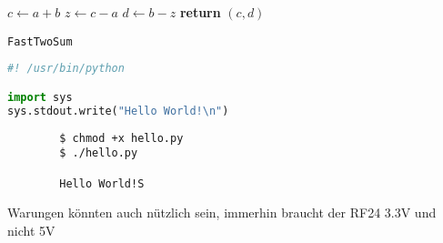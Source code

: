\documentclass[12pt]{article}
\begin{document}
\begin{center}
	\begin{minipage}{0.5\linewidth} %
		\begin{algorithm}[H]
			\medskip
			$c \leftarrow a + b$ \;
			$z \leftarrow c - a$ \;
			$d \leftarrow b - z$ \;
			{\bf return} $(c,d)$ \;
			\caption{\texttt{FastTwoSum}} %
			\label{alg:fastTwoSum}   %
		\end{algorithm}
	\end{minipage}
\end{center}


\begin{file}[hello.py]
\begin{lstlisting}[language=Python]
#! /usr/bin/python

import sys
sys.stdout.write("Hello World!\n")
\end{lstlisting}
\end{file}



\begin{commandline}
	\begin{verbatim}
		$ chmod +x hello.py
		$ ./hello.py

		Hello World!S
	\end{verbatim}
\end{commandline}


\begin{warn}[Notice:]
  Warungen könnten auch nützlich sein, immerhin braucht der RF24 3.3V und nicht 5V
\end{warn}

\end{document}
